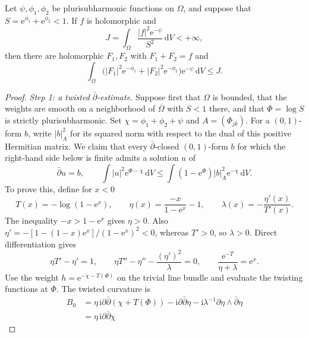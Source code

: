\begin{lemma}\label{lem:two-weight-l2-division}
Let $\psi,\phi_1,\phi_2$ be plurisubharmonic functions on $\Omega$, and suppose that $S=\mathrm e^{\phi_1}+\mathrm e^{\phi_2}<1$. If $f$ is holomorphic and
\[
 J=\int_\Omega\frac{|f|^2\mathrm e^{-\psi}}{S^2}\,\mathrm{d}V<+\infty,
\]
then there are holomorphic $F_1,F_2$ with $F_1+F_2=f$ and
\begin{equation}\label{eq:two-weight-l2-division}
 \int_\Omega\bigl(|F_1|^2\mathrm e^{-\phi_1}
                  +|F_2|^2\mathrm e^{-\phi_2}\bigr)
                    \mathrm e^{-\psi}\,\mathrm{d}V\leq J.
\end{equation}
\end{lemma}
\begin{proof}
\emph{Step 1: a twisted $\bar\partial$-estimate.} Suppose first that $\Omega$ is bounded, that the weights are smooth on a neighborhood of $\overline\Omega$ with $S<1$ there, and that $\Phi=\log S$ is strictly plurisubharmonic. Set $\chi=\phi_1+\phi_2+\psi$ and $A=(\Phi_{j\bar k})$. For a $(0,1)$-form $b$, write $|b|_A^2$ for its squared norm with respect to the dual of this positive Hermitian matrix. We claim that every $\bar\partial$-closed $(0,1)$-form $b$ for which the right-hand side below is finite admits a solution $u$ of
\begin{equation}\label{eq:negative-weight-dbar}
 \bar\partial u=b,\qquad
 \int |u|^2\mathrm e^{\Phi-\chi}\,\mathrm{d}V
 \leq\int (1-\mathrm e^\Phi)|b|_A^2
                         \mathrm e^{-\chi}\,\mathrm{d}V.
\end{equation}
To prove this, define for $x<0$
\[
 T(x)=-\log(1-\mathrm e^x),\qquad
 \eta(x)=\frac{-x}{1-\mathrm e^x}-1,\qquad
 \lambda(x)=-\frac{\eta'(x)}{T'(x)}.
\]
The inequality $-x>1-\mathrm e^x$ gives $\eta>0$. Also $\eta'= -[1-(1-x)\mathrm e^x]/(1-\mathrm e^x)^2<0$, whereas $T'>0$, so $\lambda>0$. Direct differentiation gives
\[
 \eta T'-\eta'=1,\qquad
 \eta T''-\eta''-\frac{(\eta')^2}{\lambda}=0,\qquad
 \frac{\mathrm e^{-T}}{\eta+\lambda}=\mathrm e^x.
\]
Use the weight $h=\mathrm e^{-\chi-T(\Phi)}$ on the trivial line bundle and evaluate the twisting functions at $\Phi$. The twisted curvature is
\[
 \begin{aligned}
 B_0&=\eta\,\mathrm i\partial\bar\partial(\chi+T(\Phi))
       -\mathrm i\partial\bar\partial\eta
       -\mathrm i\lambda^{-1}\partial\eta\wedge\bar\partial\eta\\
    &=\eta\,\mathrm i\partial\bar\partial\chi

\end{aligned}\]
\end{proof}
